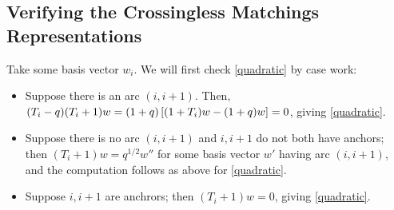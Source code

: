 \documentclass{amsart}
\begin{document}
\subsection{Verifying the Crossingless Matchings Representations}
\label{Cross Relations}
Take some basis vector $w_i$.
We will first check \eqref{quadratic} by case work:
\begin{itemize}
  \item Suppose there is an arc $(i,i+1)$.
    Then, $(T_i-q)(T_i + 1)w = (1 + q)\left[ (1 + T_i)w - (1 + q)w \right] = 0$, giving \eqref{quadratic}.

 
  \item Suppose there is no arc $(i,i+1)$ and $i,i+1$ do not both have anchors;
    then $(T_i +  1)w = q^{1/2}w''$ for some basis vector $w'$ having arc $(i,i+1)$, and the computation follows as above for \eqref{quadratic}.
  \item Suppose $i,i+1$ are anchrors;
    then $(T_i + 1)w = 0$, giving \eqref{quadratic}.
\end{itemize}
  
\end{document}
